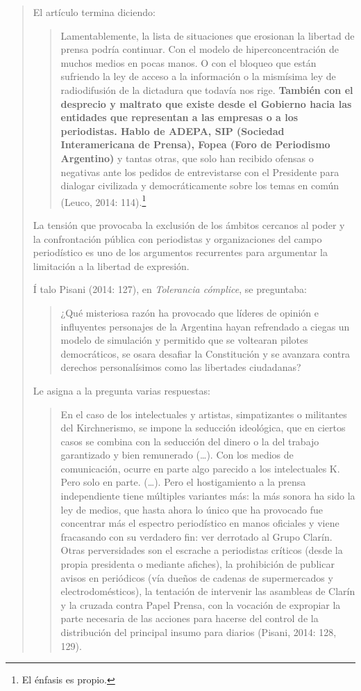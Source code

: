 \begin{quote}
El artículo termina diciendo:

\begin{quote}
	Lamentablemente, la lista de situaciones que erosionan la libertad de prensa podría continuar. Con el modelo de hiperconcentración de muchos medios en pocas manos. O con el bloqueo que están sufriendo la ley de acceso a la información o la mismísima ley de radiodifusión de la dictadura que todavía nos rige. \textbf{También con el desprecio y maltrato que existe desde el Gobierno hacia las entidades que representan a las empresas o a los periodistas. Hablo de ADEPA, SIP (Sociedad Interamericana de Prensa), Fopea (Foro de Periodismo Argentino)} y tantas otras, que solo han recibido ofensas o negativas ante los pedidos de entrevistarse con el Presidente para dialogar civilizada y democráticamente sobre los temas en común (Leuco, 2014: 114).\footnote{El énfasis es propio.}
\end{quote}


La tensión que provocaba la exclusión de los ámbitos cercanos al poder y la confrontación pública con periodistas y organizaciones del campo periodístico es uno de los argumentos recurrentes para argumentar la limitación a la libertad de expresión.

Í talo Pisani (2014: 127), en \emph{Tolerancia cómplice}, se preguntaba:

\begin{quote}
	¿Qué misteriosa razón ha provocado que líderes de opinión e influyentes personajes de la Argentina hayan refrendado a ciegas un modelo de simulación y permitido que se voltearan pilotes democráticos, se osara desafiar la Constitución y se avanzara contra derechos personalísimos como las libertades ciudadanas?
\end{quote}


Le asigna a la pregunta varias respuestas:

\begin{quote}
	En el caso de los intelectuales y artistas, simpatizantes o militantes del Kirchnerismo, se impone la seducción ideológica, que en ciertos casos se combina con la seducción del dinero o la del trabajo garantizado y bien remunerado (\dots). Con los medios de comunicación, ocurre en parte algo parecido a los intelectuales K. Pero solo en parte. (\dots). Pero el hostigamiento a la prensa independiente tiene múltiples variantes más: la más sonora ha sido la ley de medios, que hasta ahora lo único que ha provocado fue concentrar más el espectro periodístico en manos oficiales y viene fracasando con su verdadero fin: ver derrotado al Grupo Clarín. Otras perversidades son el escrache a periodistas críticos (desde la propia presidenta o mediante afiches), la prohibición de publicar avisos en periódicos (vía dueños de cadenas de supermercados y electrodomésticos), la tentación de intervenir las asambleas de Clarín y la cruzada contra Papel Prensa, con la vocación de expropiar la parte necesaria de las acciones para hacerse del control de la distribución del principal insumo para diarios (Pisani, 2014: 128, 129).
\end{quote}



\end{quote}
